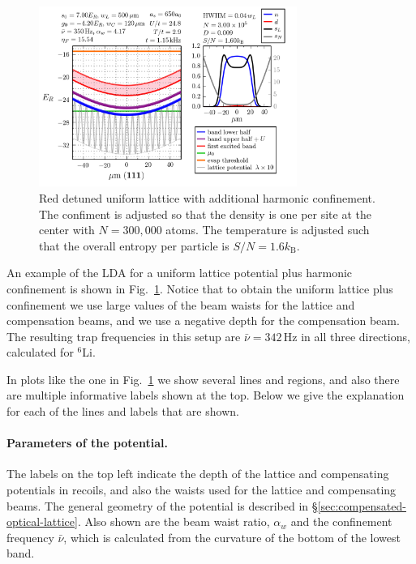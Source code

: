 \documentclass[11pt,letter]{article}
\newcommand{\awaist}{\ensuremath{ \alpha_{w} }}
\begin{document}
\begin{figure}
    \centering
\includegraphics[width=0.75\textwidth]{figures_hubbard-lda/harmonic.png}
\caption{Red detuned uniform lattice with additional harmonic confinement.  The
confiment is adjusted so that the density is one per site at the center with
$N=300,000$ atoms.   The temperature is adjusted such that the overall entropy
per particle is $S/N=1.6k_{\text{B}}$. }  
      \label{fig:HTSE_LDA_harmonic}
\end{figure} 
An example of the LDA for a  uniform lattice potential plus harmonic
confinement is shown in Fig.~\ref{fig:HTSE_LDA_harmonic}.  Notice that to
obtain the uniform lattice plus confinement we use large values of the beam
waists for the lattice and compensation beams, and we use a negative depth for
the compensation beam.  The resulting trap frequencies in this setup are
$\bar{\nu} = 342\,\mathrm{Hz}$ in all three directions, calculated for
$^{6}$Li. 

In plots like the one in Fig.~\ref{fig:HTSE_LDA_harmonic} we show several lines
and regions, and also there are multiple informative labels shown at the top.
Below we give the explanation for each of the lines and labels that are shown.
 
\paragraph{Parameters of the potential.}  The labels on the top left indicate
the depth of the lattice and compensating potentials in recoils, and also the
waists used for the lattice and compensating beams.   The general geometry of
the potential is described in \S\ref{sec:compensated-optical-lattice}.  Also
shown are the beam waist ratio, $\awaist$ and the confinement frequency
$\bar{\nu}$, which is calculated from the curvature of the bottom of the lowest
band. 
\end{document}
